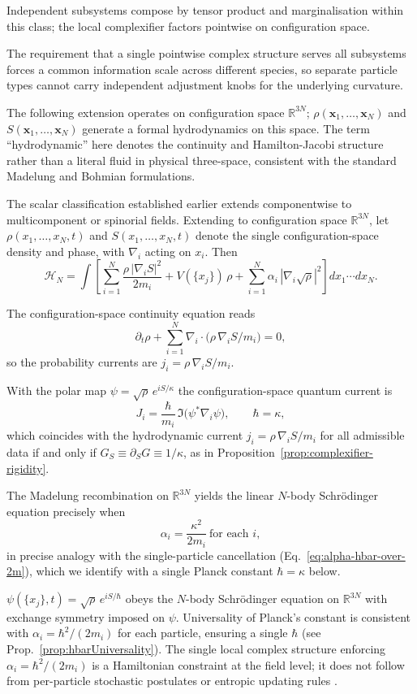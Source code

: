 \documentclass[11pt,a4paper]{article}
\numberwithin{equation}{section}
\theoremstyle{thmcompact}
\theoremstyle{remark}
\begin{document}
	Independent subsystems compose by tensor product and marginalisation within this class; the local complexifier factors pointwise on configuration space.
	
	The requirement that a single pointwise complex structure serves all subsystems forces a common information scale across different species, so separate particle types cannot carry independent adjustment knobs for the underlying curvature.
	
	The following extension operates on configuration space $\mathbb{R}^{3N}$; $\rho(\mathbf{x}_1,\!\dots,\!\mathbf{x}_N)$ and $S(\mathbf{x}_1,\!\dots,\!\mathbf{x}_N)$ generate a formal hydrodynamics on this space.  The term ``hydrodynamic'' here denotes the continuity and Hamilton-Jacobi structure rather than a literal fluid in physical three-space, consistent with the standard Madelung and Bohmian formulations.
	
	The scalar classification established earlier extends componentwise to multicomponent or spinorial fields.
	Extending to configuration space $\mathbb{R}^{3N}$, let $\rho(x_1,\dots,x_N,t)$ and $S(x_1,\dots,x_N,t)$ denote the single configuration-space density and phase, with $\nabla_i$ acting on $x_i$.
	Then
	\[
	\mathcal{H}_N=\int
	\left[
	\sum_{i=1}^N \frac{\rho\,|\nabla_i S|^2}{2m_i}
	+V(\{x_j\})\,\rho
	+\sum_{i=1}^N \alpha_i\,|\nabla_i\sqrt{\rho}|^2
	\right]dx_1\cdots dx_N.
	\]
	
	The configuration-space continuity equation reads
	\[
	\partial_t \rho+\sum_{i=1}^{N}\nabla_i\!\cdot\!\Big(\rho\,\nabla_i S/m_i\Big)=0,
	\]
	so the probability currents are \(j_i=\rho\,\nabla_i S/m_i\).
	
With the polar map \(\psi=\sqrt{\rho}\,e^{iS/\kappa}\) the configuration-space quantum current is
\[
J_i=\frac{\hbar}{m_i}\,\Im\bigl(\psi^{*}\nabla_i\psi\bigr),\qquad \hbar=\kappa,
\]
which coincides with the hydrodynamic current \(j_i=\rho\,\nabla_i S/m_i\) for all admissible data if and only if
\(G_{S}\equiv\partial_{S}G\equiv 1/\kappa\), as in Proposition~\ref{prop:complexifier-rigidity}.

	The Madelung recombination on \(\mathbb{R}^{3N}\) yields the linear $N$-body Schrödinger equation precisely when
	\[
	\alpha_i=\frac{\kappa^{2}}{2m_i}\ \text{for each }i,
	\]
	in precise analogy with the single-particle cancellation (Eq.~\eqref{eq:alpha-hbar-over-2m}), which we identify with a single Planck constant $\hbar=\kappa$ below.
	
	$\psi(\{x_j\},t)=\sqrt{\rho}\,e^{iS/\hbar}$ obeys the $N$-body Schrödinger equation on $\mathbb{R}^{3N}$ with exchange symmetry imposed on $\psi$.
	Universality of Planck’s constant is consistent with $\alpha_i=\hbar^2/(2m_i)$ for each particle, ensuring a single $\hbar$ (see Prop.~\ref{prop:hbarUniversality}).
	The single local complex structure enforcing $\alpha_i=\hbar^2/(2m_i)$ is a Hamiltonian constraint at the field level; it does not follow from per-particle stochastic postulates or entropic updating rules \cite{nelson1966,caticha2012}.
	
\end{document}
